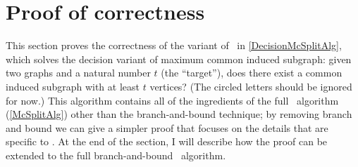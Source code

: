\section{Proof of correctness}\label{sec:mcsplit-proof}

This section proves the correctness of the variant of \McSplit\ in \cref{DecisionMcSplitAlg}, which solves
the decision variant of maximum common induced subgraph: given two graphs and a natural number
$t$ (the ``target''), does there exist a common induced subgraph with at least $t$ vertices?
(The circled letters should be ignored for now.)
This algorithm contains all of the ingredients of the full \McSplit\ algorithm (\cref{McSplitAlg})
other than the branch-and-bound technique; by removing branch and bound we can give a simpler
proof that focuses on the details that are specific to \McSplit.  At the end of the section,
I will describe how the proof can be extended to the full branch-and-bound \McSplit\ algorithm.

